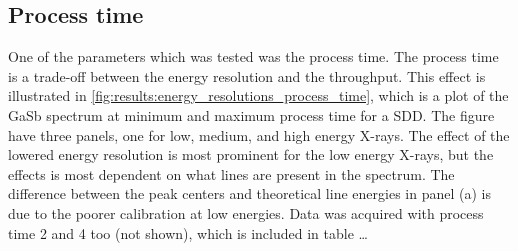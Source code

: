 \subsection{Process time}
\label{results:process_time}

One of the parameters which was tested was the process time.
The process time is a trade-off between the energy resolution and the throughput.
This effect is illustrated in \cref{fig:results:energy_resolutions_process_time}, which is a plot of the GaSb spectrum at minimum and maximum process time for a SDD.
The figure have three panels, one for low, medium, and high energy X-rays.
The effect of the lowered energy resolution is most prominent for the low energy X-rays, but the effects is most dependent on what lines are present in the spectrum.
The difference between the peak centers and theoretical line energies in panel (a) is due to the poorer calibration at low energies.
Data was acquired with process time 2 and 4 too (not shown), which is included in table \dots


